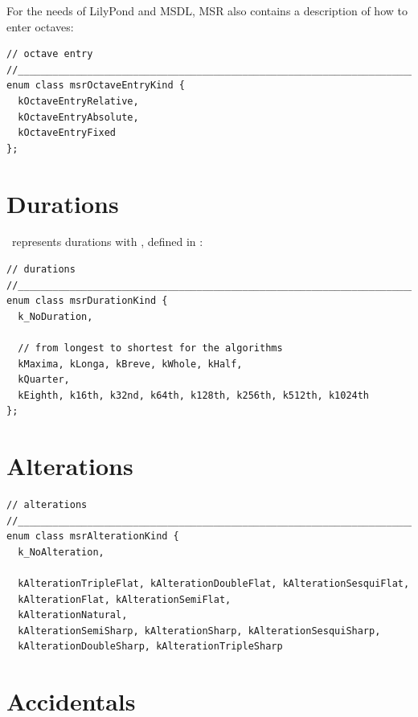 For the needs of LilyPond and MSDL, MSR also contains a description of how to enter octaves:
\begin{lstlisting}[language=CPlusPlus]
// octave entry
//______________________________________________________________________________
enum class msrOctaveEntryKind {
  kOctaveEntryRelative,
  kOctaveEntryAbsolute,
  kOctaveEntryFixed
};
\end{lstlisting}


\section{Durations}\label{Durations}

\mf\ represents durations with , defined in :
\begin{lstlisting}[language=CPlusPlus]
// durations
//______________________________________________________________________________
enum class msrDurationKind {
  k_NoDuration,

  // from longest to shortest for the algorithms
  kMaxima, kLonga, kBreve, kWhole, kHalf,
  kQuarter,
  kEighth, k16th, k32nd, k64th, k128th, k256th, k512th, k1024th
};
\end{lstlisting}

\section{Alterations}\label{Alterations}

\begin{lstlisting}[language=CPlusPlus]
// alterations
//______________________________________________________________________________
enum class msrAlterationKind {
  k_NoAlteration,

  kAlterationTripleFlat, kAlterationDoubleFlat, kAlterationSesquiFlat,
  kAlterationFlat, kAlterationSemiFlat,
  kAlterationNatural,
  kAlterationSemiSharp, kAlterationSharp, kAlterationSesquiSharp,
  kAlterationDoubleSharp, kAlterationTripleSharp
\end{lstlisting}


\section{Accidentals}\label{Accidentals}

